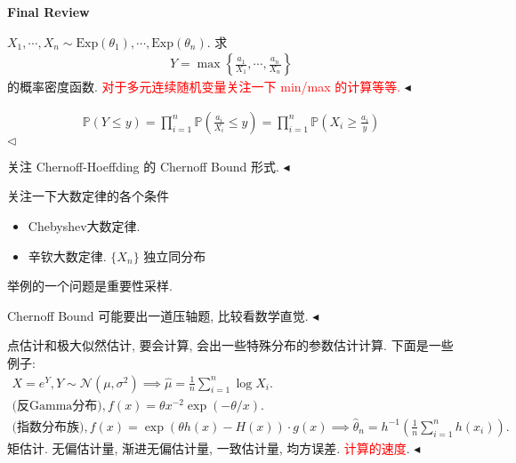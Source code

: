 \documentclass[11pt]{article}
\newenvironment{problem}[2][Problem]{\begin{trivlist}
    \item[\hskip \labelsep {\bfseries #1}\hskip \labelsep {\bfseries #2.}]\songti}{\hfill$\blacktriangleleft$\end{trivlist}}
\newenvironment{answer}[1][Solution]{\begin{trivlist}
    \item[\hskip \labelsep {\bfseries #1.}\hskip \labelsep]}{\hfill$\lhd$\end{trivlist}}
\newcommand\1{\mathds{1}}
\newcommand\NN{\mathcal{N}}
\newcommand\PP{\mathbb{P}}
\newcommand{\Exp}{\mathrm{Exp}}
\begin{document}
\kaishu

\pagestyle{fancy}
\chead{}
\fancyfoot[R]{} 
\fancyfoot[C]{\thepage\ /\ \pageref{LastPage} \\ \textcolor{lightgray}{最后编译时间: \today}}

\begin{center}
    {\LARGE \bf Final Review}
\end{center}

\begin{problem}{1. 多元随机变量}
    $X_1, \cdots, X_n \sim \Exp(\theta_1), \cdots ,\Exp(\theta_n)$. 求
    \begin{align*}
        Y = \max\left\{\frac{a_1}{X_1}, \cdots, \frac{a_n}{X_n}\right\}
    \end{align*}
    的概率密度函数.
    \textcolor{red}{对于多元连续随机变量关注一下 min/max 的计算等等.}
\end{problem}

\begin{answer}
    \begin{align*}
        \PP(Y \le y) = \prod_{i=1}^{n} \PP\left(\frac{a_i}{X_i} \le y\right) = \prod_{i=1}^{n} \PP\left(X_i \ge \frac{a_i}{y}\right)
    \end{align*}
\end{answer}

\begin{problem}{2. Tail inequality}
    关注 Chernoff-Hoeffding 的 Chernoff Bound 形式.
\end{problem}

\begin{problem}{3. Law of Large Number}
    关注一下大数定律的各个条件
    \begin{itemize}
        \item Chebyshev大数定律.
        \item 辛钦大数定律. $\{X_n\}$ 独立同分布
    \end{itemize}
    举例的一个问题是重要性采样.

    Chernoff Bound 可能要出一道压轴题, 比较看数学直觉.
\end{problem}

\begin{problem}{4. 参数估计}
    点估计和极大似然估计, 要会计算, 会出一些特殊分布的参数估计计算. 下面是一些例子:
    \begin{gather*}
        X = e^Y, Y \sim \NN(\mu, \sigma^2) \implies \hat{\mu} = \frac{1}{n} \sum_{i=1}^n \log X_i. \\
        \text{(反Gamma分布)}, f(x) = \theta x^{-2} \exp(-\theta/x). \\
        \text{(指数分布族)}, f(x) = \exp(\theta h(x) - H(x)) \cdot g(x) \implies \hat{\theta}_n = h^{-1}\left(\frac{1}{n}\sum_{i=1}^n h(x_i)\right). 
    \end{gather*}
    矩估计. 无偏估计量, 渐进无偏估计量, 一致估计量, 均方误差. \textcolor{red}{计算的速度}.
\end{problem}
\end{document}
